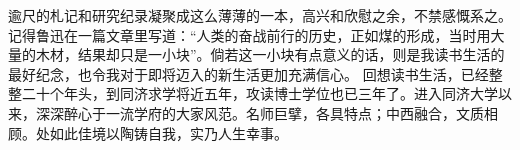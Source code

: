 \begin{ack}\fs
逾尺的札记和研究纪录凝聚成这么薄薄的一本，高兴和欣慰之余，不禁感慨系之。记得鲁迅在一篇文章里写道：“人类的奋战前行的历史，正如煤的形成，当时用大量的木材，结果却只是一小块”。倘若这一小块有点意义的话，则是我读书生活的最好纪念，也令我对于即将迈入的新生活更加充满信心。
回想读书生活，已经整整二十个年头，到同济求学将近五年，攻读博士学位也已三年了。进入同济大学以来，深深醉心于一流学府的大家风范。名师巨擘，各具特点；中西融合，文质相顾。处如此佳境以陶铸自我，实乃人生幸事。

\ackdate
\end{ack}

